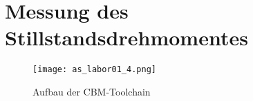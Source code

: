 \section{Messung des Stillstandsdrehmomentes}

\begin{figure}[htp]
 \centering
 \texttt{[image: as\_labor01\_4.png]}
 \caption{Aufbau der CBM-Toolchain}
 \label{fig:Plot Aufgabe 4}
\end{figure}


